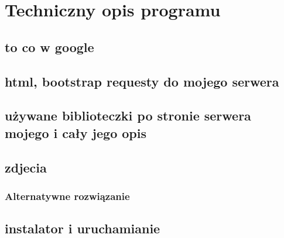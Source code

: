\chapter{Techniczny opis programu}
\section{to co w google}
\section{html, bootstrap requesty do mojego serwera}
\section{używane biblioteczki po stronie serwera mojego i cały jego opis}
\section{zdjecia}

\subsection{Alternatywne rozwiązanie}%
 
\section{instalator i uruchamianie}
